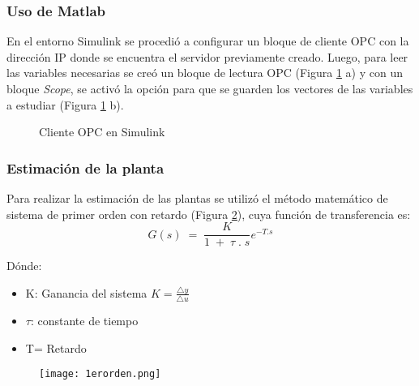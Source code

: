 \subsubsection{Uso de Matlab}
En el entorno Simulink se procedió a configurar un bloque de cliente OPC con la dirección IP donde se encuentra el servidor previamente creado. Luego, para leer las variables necesarias se creó un bloque de lectura OPC (Figura \ref{fig:opcsimu} a) y con un bloque \textit{Scope}, se activó la opción para que se guarden los vectores de las variables a estudiar (Figura \ref{fig:opcsimu} b). 


\begin{figure}[htbp]
	\centering
	\caption{Cliente OPC en Simulink} \label{fig:opcsimu}
\end{figure}



\subsubsection{Estimación de la planta}

Para realizar la estimación de las plantas se utilizó el método matemático de sistema de primer orden con retardo (Figura \ref{fig:1erorden}), cuya función de transferencia es: \\
\begin{equation}
	G(s)\;=\;\frac K{1\;+\;\tau\;.\;s}e^{-T.s}
\end{equation}


Dónde:
\begin{itemize}
	\item K:  Ganancia del sistema $K = \frac{\triangle y}{\triangle u}$
	\item $\tau$: constante de tiempo
	\item T= Retardo
\end{itemize}

\begin{figure}[htb]
	\centering
	\texttt{[image: 1erorden.png]}
	\label{fig:1erorden}
\end{figure}